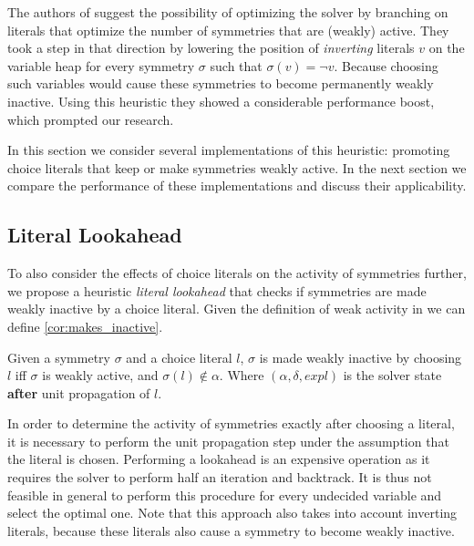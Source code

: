 
The authors of \cite{devriendt2012symmetry,katebi2010symmetry} suggest the possibility of optimizing the solver by
branching on literals that optimize the number of symmetries that are (weakly) active.
They took a step in that direction by lowering the position of \emph{inverting} literals $v$ on the variable heap for
every symmetry $\sigma$ such that $\sigma(v) = \neg v$.
Because choosing such variables would cause these symmetries to become permanently weakly inactive.
Using this heuristic they showed a considerable performance boost, which prompted our research.

In this section we consider several implementations of this heuristic: promoting choice literals
that keep or make symmetries weakly active.
In the next section we compare the performance of these implementations and discuss their
applicability.

\subsection{Literal Lookahead}
	To also consider the effects of choice literals on the activity of symmetries further,
	we propose a heuristic \emph{literal lookahead} that checks if symmetries are made weakly inactive by a choice literal.
	Given the definition of weak activity in \cite{devriendt2012symmetry} we can define \cref{cor:makes_inactive}.\\

	\begin{corollary}
		\label{cor:makes_inactive}
		Given a symmetry $\sigma$ and a choice literal $l$,
		$\sigma$ is made weakly inactive by choosing $l$ iff
		$\sigma$ is weakly active, and $\sigma(l) \notin \alpha$.
		Where $(\alpha,\delta,\textit{expl})$ is the solver state \textbf{after} unit propagation of $l$. 
	\end{corollary}

	In order to determine the activity of symmetries exactly after choosing a literal,
	it is necessary to perform the unit propagation step under the assumption that the literal is chosen.
	Performing a lookahead is an expensive operation as it requires the solver to perform half an
	iteration and backtrack.
	It is thus not feasible in general to perform this procedure for every undecided variable and
	select the optimal one.
	Note that this approach also takes into account inverting literals,
	because these literals also cause a symmetry to become weakly inactive.
	
